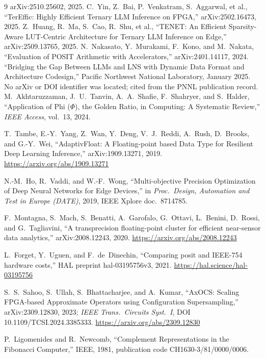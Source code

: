 \documentclass[11pt]{article}
\theoremstyle{definition}
\begin{document}
\begin{thebibliography}{9}
arXiv:2510.25602, 2025.
 C.~Yin, Z.~Bai, P.~Venkatram, S.~Aggarwal, et al.,
``TerEffic: Highly Efficient Ternary LLM Inference on FPGA,'' arXiv:2502.16473,
2025.
 Z.~Huang, R.~Ma, S.~Cao, R.~Shu, et al., ``TENET: An
Efficient Sparsity-Aware LUT-Centric Architecture for Ternary LLM Inference on
Edge,'' arXiv:2509.13765, 2025.
 N.~Nakasato, Y.~Murakami, F.~Kono, and M.~Nakata,
``Evaluation of POSIT Arithmetic with Accelerators,'' arXiv:2401.14117, 2024.
 ``Bridging the Gap Between LLMs and LNS with Dynamic Data
Format and Architecture Codesign,'' Pacific Northwest National Laboratory,
January 2025. No arXiv or DOI identifier was located; cited from the PNNL
publication record.
 M.~Akhtaruzzaman, J.~U.~Tanvin, A.~A.~Shafie,
F.~Shahryer, and S.~Halder, ``Application of Phi ($\Phi$), the Golden Ratio, in
Computing: A Systematic Review,'' \emph{IEEE Access}, vol.~13, 2024.

 T.~Tambe, E.-Y.~Yang, Z.~Wan, Y.~Deng, V.~J.~Reddi, A.~Rush, D.~Brooks, and G.-Y.~Wei, ``AdaptivFloat: A Floating-point based Data Type for Resilient Deep Learning Inference,'' arXiv:1909.13271, 2019. \url{https://arxiv.org/abs/1909.13271}

 N.-M.~Ho, R.~Vaddi, and W.-F.~Wong, ``Multi-objective Precision Optimization of Deep Neural Networks for Edge Devices,'' in \emph{Proc.\ Design, Automation and Test in Europe (DATE)}, 2019, IEEE Xplore doc.\ 8714785.

 F.~Montagna, S.~Mach, S.~Benatti, A.~Garofalo, G.~Ottavi, L.~Benini, D.~Rossi, and G.~Tagliavini, ``A transprecision floating-point cluster for efficient near-sensor data analytics,'' arXiv:2008.12243, 2020. \url{https://arxiv.org/abs/2008.12243}

 L.~Forget, Y.~Uguen, and F.~de~Dinechin, ``Comparing posit and IEEE-754 hardware costs,'' HAL preprint hal-03195756v3, 2021. \url{https://hal.science/hal-03195756}

 S.~S.~Sahoo, S.~Ullah, S.~Bhattacharjee, and A.~Kumar, ``AxOCS: Scaling FPGA-based Approximate Operators using Configuration Supersampling,'' arXiv:2309.12830, 2023; \emph{IEEE Trans.\ Circuits Syst.\ I}, DOI 10.1109/TCSI.2024.3385333. \url{https://arxiv.org/abs/2309.12830}

 P.~Ligomenides and R.~Newcomb, ``Complement Representations in the Fibonacci Computer,'' IEEE, 1981, publication code CH1630-3/81/0000/0006.


\end{thebibliography}
\end{document}
